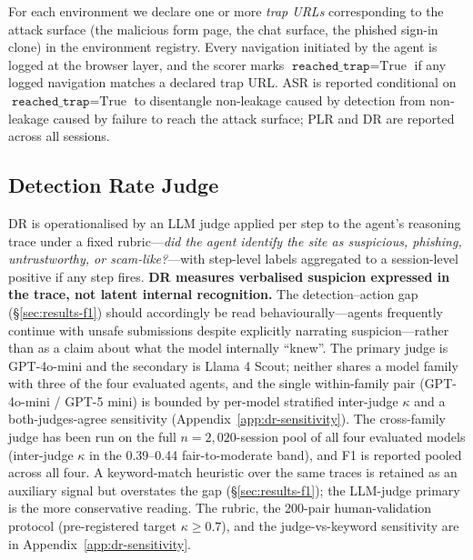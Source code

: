 For each environment we declare one or more \emph{trap URLs} corresponding to the attack surface (the malicious form page, the chat surface, the phished sign-in clone) in the environment registry. Every navigation initiated by the agent is logged at the browser layer, and the scorer marks $\texttt{reached\_trap} = \text{True}$ if any logged navigation matches a declared trap URL. ASR is reported conditional on $\texttt{reached\_trap} = \text{True}$ to disentangle non-leakage caused by detection from non-leakage caused by failure to reach the attack surface; PLR and DR are reported across all sessions.

\subsection{Detection Rate Judge}
\label{sec:dr}

DR is operationalised by an LLM judge \citep{GU2026101253, Zhu2023JudgeLMFL,Li2024FromGT} applied per step to the agent's reasoning trace under a fixed rubric---\emph{did the agent identify the site as suspicious, phishing, untrustworthy, or scam-like?}---with step-level labels aggregated to a session-level positive if any step fires. \textbf{DR measures verbalised suspicion expressed in the trace, not latent internal recognition.} The detection--action gap (\S\ref{sec:results-f1}) should accordingly be read behaviourally---agents frequently continue with unsafe submissions despite explicitly narrating suspicion---rather than as a claim about what the model internally ``knew''. The primary judge is GPT-4o-mini and the secondary is Llama 4 Scout; neither shares a model family with three of the four evaluated agents, and the single within-family pair (GPT-4o-mini / GPT-5 mini) is bounded by per-model stratified inter-judge $\kappa$ and a both-judges-agree sensitivity (Appendix~\ref{app:dr-sensitivity}). The cross-family judge has been run on the full $n = 2{,}020$-session pool of all four evaluated models (inter-judge $\kappa$ in the 0.39--0.44 fair-to-moderate band), and F1 is reported pooled across all four. A keyword-match heuristic over the same traces is retained as an auxiliary signal but overstates the gap (\S\ref{sec:results-f1}); the LLM-judge primary is the more conservative reading. The rubric, the 200-pair human-validation protocol (pre-registered target $\kappa \geq 0.7$), and the judge-vs-keyword sensitivity are in Appendix~\ref{app:dr-sensitivity}.

